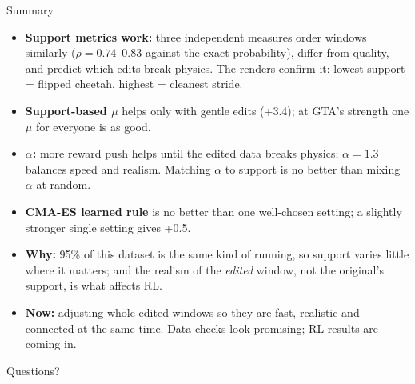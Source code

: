 \documentclass[aspectratio=169,10pt]{beamer}
\begin{document}
\begin{frame}{Summary}
\begin{itemize}
\item \textbf{Support metrics work:} three independent measures order windows similarly ($\rho = 0.74$--0.83 against the exact probability), differ from quality, and predict which edits break physics. The renders confirm it: lowest support = flipped cheetah, highest = cleanest stride.
\item \textbf{Support-based $\mu$} helps only with gentle edits (+3.4); at GTA's strength one $\mu$ for everyone is as good.
\item \textbf{$\alpha$:} more reward push helps until the edited data breaks physics; $\alpha = 1.3$ balances speed and realism. Matching $\alpha$ to support is no better than mixing $\alpha$ at random.
\item \textbf{CMA-ES learned rule} is no better than one well-chosen setting; a slightly stronger single setting gives +0.5.
\item \textbf{Why:} 95\% of this dataset is the same kind of running, so support varies little where it matters; and the realism of the \emph{edited} window, not the original's support, is what affects RL.
\item \textbf{Now:} adjusting whole edited windows so they are fast, realistic and connected at the same time. Data checks look promising; RL results are coming in.
\end{itemize}
\vspace{0.5em}
\centering\Large Questions?
\end{frame}
\end{document}
